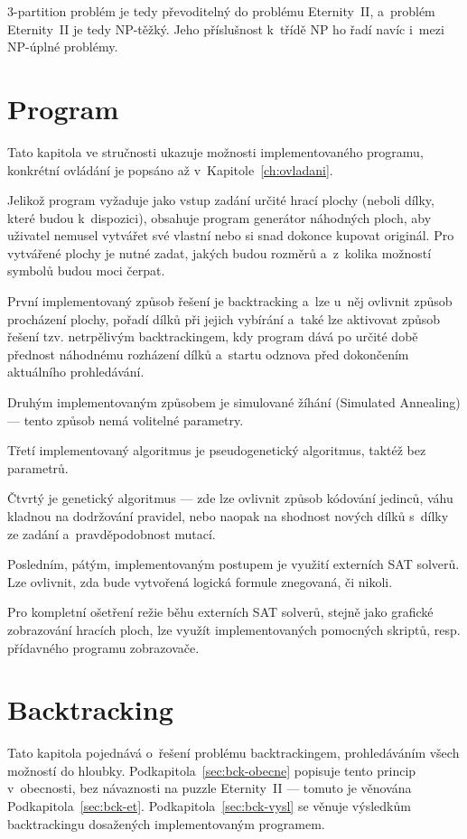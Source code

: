\documentclass[11pt, titlepage]{report}
\begin{document}
3-partition problém je tedy převoditelný do problému Eternity~II, a~problém Eternity~II je tedy NP-těžký. Jeho příslušnost k~třídě NP ho řadí navíc i~mezi NP-úplné problémy.


\chapter{Program}
\label{ch:program}

Tato kapitola ve stručnosti ukazuje možnosti implementovaného programu, konkrétní ovládání je popsáno až v~Kapitole~\ref{ch:ovladani}.

Jelikož program vyžaduje jako vstup zadání určité hrací plochy (neboli dílky, které budou k~dispozici), obsahuje program generátor náhodných ploch, aby uživatel nemusel vytvářet své vlastní nebo si snad dokonce kupovat originál. Pro vytvářené plochy je nutné zadat, jakých budou rozměrů a~z~kolika možností symbolů budou moci čerpat.

První implementovaný způsob řešení je backtracking a~lze u~něj ovlivnit způsob procházení plochy, pořadí dílků při jejich vybírání a~také lze aktivovat způsob řešení tzv. netrpělivým backtrackingem, kdy program dává po určité době přednost náhodnému rozházení dílků a~startu odznova před dokončením aktuálního prohledávání.

Druhým implementovaným způsobem je simulované žíhání (Simulated Annealing) --- tento způsob nemá volitelné parametry.

Třetí implementovaný algoritmus je pseudogenetický algoritmus, taktéž bez parametrů.

Čtvrtý je genetický algoritmus --- zde lze ovlivnit způsob kódování jedinců, váhu kladnou na dodržování pravidel, nebo naopak na shodnost nových dílků s~dílky ze zadání a~pravděpodobnost mutací.

Posledním, pátým, implementovaným postupem je využití externích SAT solverů. Lze ovlivnit, zda bude vytvořená logická formule znegovaná, či nikoli.

Pro kompletní ošetření režie běhu externích SAT solverů, stejně jako grafické zobrazování hracích ploch, lze využít implementovaných pomocných skriptů, resp. přídavného programu zobrazovače.


\chapter{Backtracking}
\label{ch:backtracking}

Tato kapitola pojednává o~řešení problému backtrackingem, prohledáváním všech možností do hloubky. Podkapitola~\ref{sec:bck-obecne} popisuje tento princip v~obecnosti, bez návaznosti na puzzle Eternity~II --- tomuto je věnována Podkapitola~\ref{sec:bck-et}. Podkapitola~\ref{sec:bck-vysl} se věnuje výsledkům backtrackingu dosažených implementovaným programem.
\end{document}
